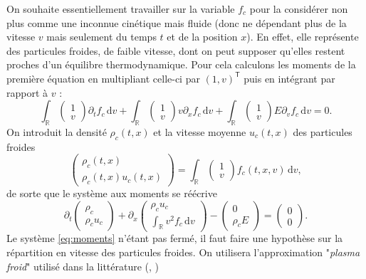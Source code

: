 On souhaite essentiellement travailler sur la variable $f_c$ pour la considérer non plus comme une inconnue cinétique mais fluide (donc ne dépendant plus de la vitesse $v$ mais seulement du temps $t$ et de la position $x$). En effet, elle représente des particules froides, de faible vitesse, dont on peut supposer qu'elles restent proches d'un équilibre thermodynamique. Pour cela calculons les moments de la première équation en multipliant celle-ci par $(1,v)^{\textsf{T}}$ puis en intégrant par rapport à $v$ :
$$
  \int_{\mathbb{R}} \begin{pmatrix}1 \\ v\end{pmatrix} \partial_tf_c\,\mathrm{d}v
  + \int_{\mathbb{R}} \begin{pmatrix}1 \\ v\end{pmatrix} v\partial_xf_c\,\mathrm{d}v
  + \int_{\mathbb{R}} \begin{pmatrix}1 \\ v\end{pmatrix} E\partial_vf_c\,\mathrm{d}v = 0. 
$$
On introduit la densité $\rho_c(t, x)$ et la vitesse moyenne $u_c(t, x)$ des particules froides
$$
\begin{pmatrix}\rho_c(t, x) \\ \rho_c(t, x) u_c(t, x)\end{pmatrix}
= 
\int_{\mathbb{R}} \begin{pmatrix}1 \\ v\end{pmatrix}f_c(t, x, v)\,\mathrm{d}v,   
$$
de sorte que le système aux moments se réécrive
\begin{equation}
  \partial_t \begin{pmatrix}\rho_c \\ \rho_c u_c \end{pmatrix}
  + \partial_x \begin{pmatrix} \rho_c u_c \\  \int_{\mathbb{R}} v^2 f_c \,\mathrm{d}v \end{pmatrix}
  - \begin{pmatrix} 0 \\ \rho_c E \end{pmatrix}
  = \begin{pmatrix} 0 \\ 0 \end{pmatrix}.
\label{eq:moments}
\end{equation}
Le système \eqref{eq:moments} n'étant pas fermé, il faut faire une hypothèse sur la répartition en vitesse des particules froides. On utilisera l'approximation "\emph{plasma froid}" utilis\'e dans la litt\'erature (\cite{Tronci:2014}, \cite{Holderied:2019}) 
